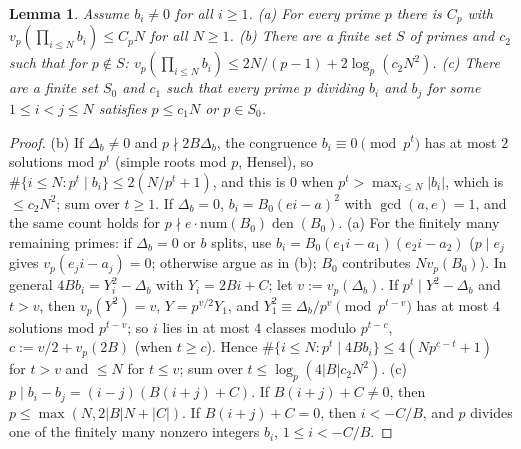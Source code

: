 \documentclass[11pt]{amsart}
\newtheorem{lemma}{Lemma}[section]
\theoremstyle{definition}
\theoremstyle{remark}
\numberwithin{equation}{section}
\newcommand{\den}{\operatorname{den}}
\begin{document}
\begin{lemma}\label{lem:val}
Assume $b_i\neq0$ for all $i\ge1$. \textup{(a)} For every prime $p$ there is $C_p$ with $v_p(\prod_{i\le N}b_i)\le C_pN$ for all $N\ge1$. \textup{(b)} There are a finite set $S$ of primes and $c_2$ such that for $p\notin S$: $v_p(\prod_{i\le N}b_i)\le2N/(p-1)+2\log_p(c_2N^2)$. \textup{(c)} There are a finite set $S_0$ and $c_1$ such that every prime $p$ dividing $b_i$ and $b_j$ for some $1\le i<j\le N$ satisfies $p\le c_1N$ or $p\in S_0$.
\end{lemma}
\begin{proof}
(b) If $\Delta_b\neq0$ and $p\nmid2B\Delta_b$, the congruence $b_i\equiv0\pmod{p^t}$ has at most $2$ solutions mod $p^t$ (simple roots mod $p$, Hensel), so $\#\{i\le N:p^t\mid b_i\}\le2(N/p^t+1)$, and this is $0$ when $p^t>\max_{i\le N}|b_i|$, which is $\le c_2N^2$; sum over $t\ge1$. If $\Delta_b=0$, $b_i=B_0(ei-a)^2$ with $\gcd(a,e)=1$, and the same count holds for $p\nmid e\cdot\mathrm{num}(B_0)\den(B_0)$.
(a) For the finitely many remaining primes: if $\Delta_b=0$ or $b$ splits, use $b_i=B_0(e_1i-a_1)(e_2i-a_2)$ ($p\mid e_j$ gives $v_p(e_ji-a_j)=0$; otherwise argue as in (b); $B_0$ contributes $Nv_p(B_0)$). In general $4Bb_i=Y_i^2-\Delta_b$ with $Y_i=2Bi+C$; let $v:=v_p(\Delta_b)$. If $p^t\mid Y^2-\Delta_b$ and $t>v$, then $v_p(Y^2)=v$, $Y=p^{v/2}Y_1$, and $Y_1^2\equiv\Delta_b/p^v\pmod{p^{t-v}}$ has at most $4$ solutions mod $p^{t-v}$; so $i$ lies in at most $4$ classes modulo $p^{t-c}$, $c:=v/2+v_p(2B)$ (when $t\ge c$). Hence $\#\{i\le N:p^t\mid4Bb_i\}\le4(Np^{c-t}+1)$ for $t>v$ and $\le N$ for $t\le v$; sum over $t\le\log_p(4|B|c_2N^2)$.
(c) $p\mid b_i-b_j=(i-j)(B(i+j)+C)$. If $B(i+j)+C\neq0$, then $p\le\max(N,2|B|N+|C|)$. If $B(i+j)+C=0$, then $i<-C/B$, and $p$ divides one of the finitely many nonzero integers $b_i$, $1\le i<-C/B$.
\end{proof}
\end{document}
